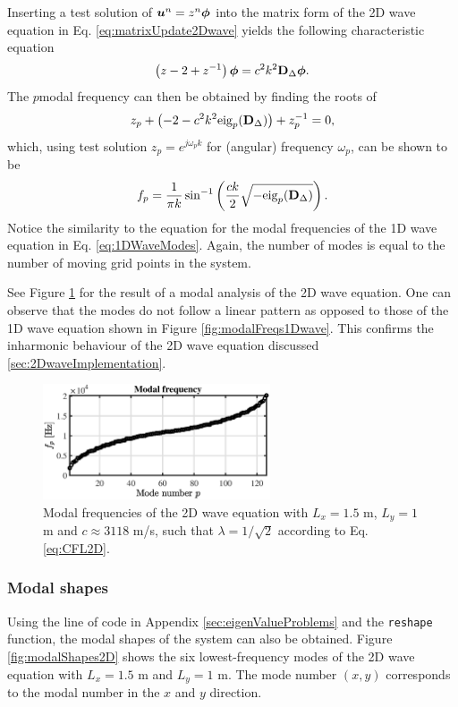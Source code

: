 Inserting a test solution of $\boldsymbol{u}^n = z^n\boldsymbol{\phi}$ into the matrix form of the 2D wave equation in Eq. \eqref{eq:matrixUpdate2Dwave} yields the following characteristic equation
\begin{equation}
   \left(z - 2 + z^{-1}\right)\boldsymbol{\phi} = c^2k^2\mathbf{D}_\Delta\boldsymbol{\phi}.
\end{equation}
The $p$\th modal frequency can then be obtained by finding the roots of 
\begin{equation}
    z_p + \left(-2 - c^2k^2\text{eig}_p(\mathbf{D}_\Delta)\right) + z_p^{-1} = 0,
\end{equation}
which, using test solution $z_p = e^{j\omega_p k}$ for (angular) frequency $\omega_p$, can be shown to be 
\begin{equation}\label{eq:2DWaveModes}
    f_p = \frac{1}{\pi k}\sin^{-1}\left(\frac{ck}{2}\sqrt{-\text{eig}_p(\mathbf{D}_\Delta)}\right).
\end{equation}
Notice the similarity to the equation for the modal frequencies of the 1D wave equation in Eq. \eqref{eq:1DWaveModes}. Again, the number of modes is equal to the number of moving grid points in the system. 

See Figure \ref{fig:modalFreqs2Dwave} for the result of a modal analysis of the 2D wave equation. One can observe that the modes do not follow a linear pattern as opposed to those of the 1D wave equation shown in Figure \ref{fig:modalFreqs1Dwave}. This confirms the inharmonic behaviour of the 2D wave equation discussed \ref{sec:2DwaveImplementation}. 
\begin{figure}[h]
    \centering
    \includegraphics[width = 0.6\textwidth]{figures/resonators/2d/modes2Dwave.eps}
    \caption{Modal frequencies of the 2D wave equation with $L_x = 1.5$ m, $L_y = 1$ m and $c\approx 3118$ m/s, such that $\lambda = 1/\sqrt{2}$ according to Eq. \eqref{eq:CFL2D}. \label{fig:modalFreqs2Dwave}}
\end{figure}
\subsubsection{Modal shapes}
Using the line of code in Appendix \ref{sec:eigenValueProblems} and the \texttt{reshape} function, the modal shapes of the system can also be obtained. Figure \ref{fig:modalShapes2D} shows the six lowest-frequency modes of the 2D wave equation with $L_x = 1.5$ m and $L_y = 1$ m. The mode number $(x,y)$ corresponds to the modal number in the $x$ and $y$ direction.

